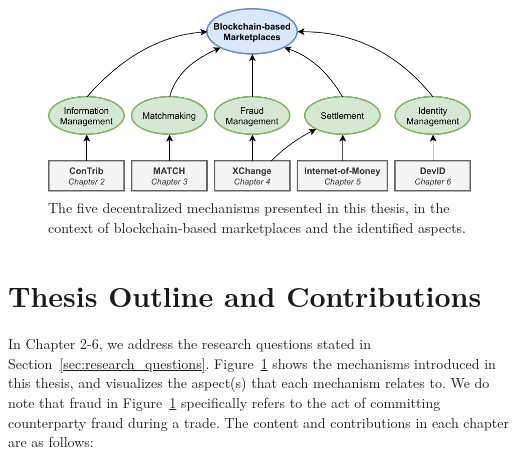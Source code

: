 


\begin{figure}[t]
	\centering
	\includegraphics[width=\linewidth]{introduction/assets/thesis_overview}
	\caption{The five decentralized mechanisms presented in this thesis, in the context of blockchain-based marketplaces and the identified aspects.}
	\label{fig:thesis_overview}
\end{figure}

\section{Thesis Outline and Contributions}
In Chapter 2-6, we address the research questions stated in Section~\ref{sec:research_questions}.
Figure~\ref{fig:thesis_overview} shows the mechanisms introduced in this thesis, and visualizes the aspect(s) that each mechanism relates to.
We do note that fraud in Figure~\ref{fig:thesis_overview} specifically refers to the act of committing counterparty fraud during a trade.
The content and contributions in each chapter are as follows:\\

